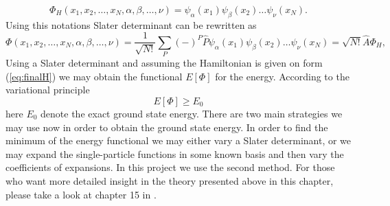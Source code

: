 \documentclass[twoside,english]{uiofysmaster}
\theoremstyle{definition}
\begin{document}
\begin{equation}
\Phi_H(x_1,x_2,\dots,x_N,\alpha,\beta,\dots,\nu) =
\psi_{\alpha}(x_1)
\psi_{\beta}(x_2)\dots\psi_{\nu}(x_N).
\end{equation}
Using this notations Slater determinant can be rewritten as
\begin{equation}\label{determ}
\Phi(x_1,x_2,\dots,x_N,\alpha,\beta,\dots,\nu) = \frac{1}{\sqrt{N!}}\sum_{P} (-)^P\hat{P}\psi_{\alpha}(x_1)
\psi_{\beta}(x_2)\dots\psi_{\nu}(x_N)=\sqrt{N!}\hat{A}\Phi_H,
\end{equation}
Using a Slater determinant and assuming the Hamiltonian is given on form (\ref{eq:finalH}) we may obtain the functional $E[\Phi]$ for the energy. According to the variational principle
\begin{equation}
E[\Phi] \ge E_0
\end{equation}
here $E_0$ denote the exact ground state energy. 
There are two main strategies we may use now in order to obtain the ground state energy. In order to find the minimum of the energy functional we may either vary a Slater determinant, or we may expand the single-particle functions in some known basis and then vary the coefficients of expansions. In this project we use the second method. For those who want more detailed insight in the theory presented above in this chapter, please take a look at chapter 15 in \cite{mortenhjorth-jensenCOMPUTATIONALPHYSICS2015}.
\end{document}
